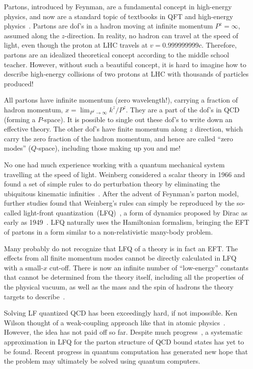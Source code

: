 \documentclass[prd,aps,twocolumn,preprintnumbers,showpacs,nofootinbib,superscriptaddress,notitlepage]{revtex4-1}
\begin{document}
Partons, introduced by Feynman, are a fundamental concept in high-energy physics,
and now are a standard topic of textbooks in QFT
and high-energy physics~\cite{Ellis:1991qj,Collins:2011zzd}.
Partons are dof's in a hadron
moving at infinite momentum $P^z=\infty$, assumed along the $z$-direction.
In reality, no hadron can travel at the speed of light, even though
the proton at LHC travels at $v=0.999999999c$. Therefore,
partons are an idealized theoretical concept according to the middle
school teacher. However, without such a beautiful concept, it is hard
to imagine how to describe high-energy collisions of two protons
at LHC with thousands of particles produced!

All partons have infinite momentum (zero wavelength!), carrying a fraction of
hadron momentum, $x=\lim_{P^z\to\infty} k^z/P^z$.
They are a part of the dof's in QCD (forming a $P$-space). It is possible to single out these dof's
to write down an effective theory. The other dof's have finite momentum along
$z$ direction, which carry the zero fraction of the hadron momentum,
and hence are called ``zero modes'' ($Q$-space), including those making
up you and me!

No one had much experience working with a quantum mechanical
system travelling at the speed of light. Weinberg considered a
scalar theory in 1966 and found a set of simple rules to
do perturbation theory by eliminating the ubiquitous kinematic
infinities~\cite{Weinberg:1966jm}. After the advent of Feynman's parton model,
further studies found that Weinberg's rules can simply be reproduced by the
so-called light-front quantization~(LFQ)~\cite{Chang:1968bh,Kogut:1969xa,Drell:1970yt},
a form of dynamics proposed by Dirac as early as 1949~\cite{Dirac:1949cp}.
LFQ naturally uses the Hamiltonian formalism, bringing the EFT of partons
in a form similar to a non-relativistic many-body problem.

Many probably do not recognize that LFQ of a theory is in fact an EFT.
The effects from all finite momentum modes
cannot be directly calculated in LFQ with a
small-$x$ cut-off. There is now an infinite number
of ``low-energy'' constants that cannot be determined from
the theory itself, including all the properties of
the physical vacuum, as well as
the mass and the spin of hadrons the theory targets to
describe~\cite{Ji:2020baz}.

Solving LF quantized QCD has been exceedingly hard, if not
impossible. Ken Wilson thought of a weak-coupling approach like that
in atomic physics~\cite{Wilson:1994fk}. However, the idea has not
paid off so far. Despite much progress~\cite{Brodsky:1997de},
a systematic approximation in LFQ for the
parton structure of QCD bound states has yet to be found. Recent
progress in quantum computation has generated new hope that the problem
may ultimately be solved using quantum computers.
\end{document}
